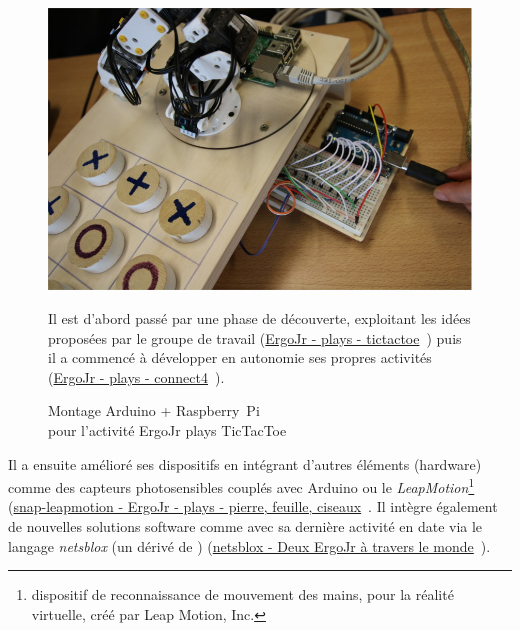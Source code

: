             \begin{figure}[!h]
            \begin{minipage}{0.6\linewidth}
                \centering
                \includegraphics[width=0.9\linewidth]{Figures/GL-tictactoe.jpg}
                \caption[Montage Arduino + Raspberry~Pi sur ErgoJr]{Montage Arduino + Raspberry~Pi\\pour l'activité ErgoJr plays TicTacToe}
                \label{fig:GL-tictactoe}
            \end{minipage}
            \hfill
            \begin{minipage}{0.375\linewidth}
            \myDefautStyle
                Il est d'abord passé par une phase de découverte, exploitant les idées proposées par le groupe de travail (\cf \href{https://www.poppy-education.org/2017/06/06/jouer-a-tictactoe-avec-robot-poppy-ergo-jr/}{ErgoJr - plays - tictactoe}~) puis il a commencé à développer en autonomie ses propres activités (\cf \href{https://forum.poppy-project.org/t/poppyergojr-plays-connect4/2562}{ErgoJr - plays - connect4}~).
            \end{minipage}
            \end{figure}{}\par%
            Il a ensuite amélioré ses dispositifs en intégrant d'autres éléments (hardware) comme des capteurs photosensibles couplés avec Arduino ou le \textit{LeapMotion}\footnote{ dispositif de reconnaissance de mouvement des mains, pour la réalité virtuelle, créé par Leap Motion, Inc.} (\cf \href{https://forum.poppy-project.org/t/snap-leapmotion-ergo-pierre-feuille-ciseaux/2928}{snap-leapmotion - ErgoJr - plays - pierre, feuille, ciseaux}~.
            Il intègre également de nouvelles solutions software comme avec sa dernière activité en date via le langage \textit{netsblox} (un dérivé de ) (\cf \href{http://yb-isn.fr/icn2017/blog/2018/01/13/netsblox-envoyer-des-messages-au-pc-da-cote-ou-beaucoup-plus-loin/}{netsblox - Deux ErgoJr à travers le monde}~).\par%
